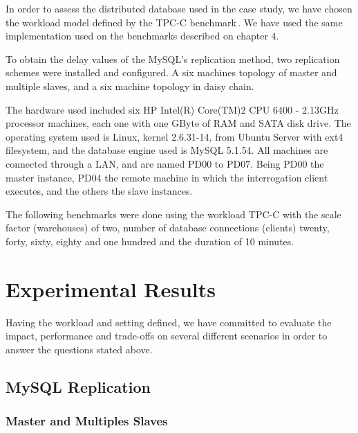 In order to assess the distributed database used in the case study, we have chosen the workload model defined by the TPC-C benchmark\,\cite{Cou01}. We have used the same implementation used on the benchmarks described on chapter 4. 

To obtain the delay values of the MySQL's replication method, two replication schemes were installed and configured. A six machines topology of master and multiple slaves, and a six machine topology in daisy chain. 

The hardware used included six HP Intel(R) Core(TM)2 CPU 6400 - 2.13GHz processor machines, each one with one GByte of RAM and SATA disk drive. The operating system used is Linux, kernel 2.6.31-14, from Ubuntu Server with ext4 filesystem, and the database engine used is MySQL 5.1.54. All machines are connected through a LAN, and are named PD00 to PD07. Being PD00 the master instance, PD04 the remote machine in which the interrogation client executes, and the others the slave instances.

The following benchmarks were done using the workload TPC-C with the scale factor (warehouses) of two, number of database connections (clients) twenty, forty, sixty, eighty and one hundred and the duration of 10 minutes.

\section{Experimental Results}



Having the workload and setting defined, we have committed to evaluate the impact, performance and trade-offs on several different scenarios in order to answer the questions stated above.

\clearpage

\subsection{MySQL Replication}

\subsubsection{Master and Multiples Slaves}

